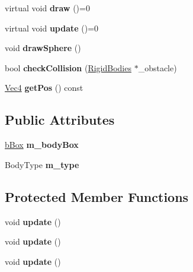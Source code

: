 \begin{DoxyCompactItemize}
\item 
\hypertarget{classRigidBodies_a766502b7ce11577ed2dcdff5c723896f}{
virtual void {\bfseries draw} ()=0}
\label{classRigidBodies_a766502b7ce11577ed2dcdff5c723896f}

\item 
\hypertarget{classRigidBodies_ab0f20db71f5433eacca400230c3beebc}{
virtual void {\bfseries update} ()=0}
\label{classRigidBodies_ab0f20db71f5433eacca400230c3beebc}

\item 
\hypertarget{classRigidBodies_a5c1853603537bf8397b1c186194da3be}{
void {\bfseries drawSphere} ()}
\label{classRigidBodies_a5c1853603537bf8397b1c186194da3be}

\item 
\hypertarget{classRigidBodies_a2b6460d70800f65e4ea2aef1a04b6c53}{
bool {\bfseries checkCollision} (\hyperlink{classRigidBodies}{RigidBodies} $\ast$\_\-obstacle)}
\label{classRigidBodies_a2b6460d70800f65e4ea2aef1a04b6c53}

\item 
\hypertarget{classRigidBodies_a7cebe73aed519b306f10b145acaf9696}{
\hyperlink{classVec4}{Vec4} {\bfseries getPos} () const }
\label{classRigidBodies_a7cebe73aed519b306f10b145acaf9696}

\end{DoxyCompactItemize}
\subsection*{Public Attributes}
\begin{DoxyCompactItemize}
\item 
\hypertarget{classRigidBodies_a08d9ec20a6c81928f618a87db2cc1f33}{
\hyperlink{structRigidBodies_1_1BBOX}{bBox} {\bfseries m\_\-bodyBox}}
\label{classRigidBodies_a08d9ec20a6c81928f618a87db2cc1f33}

\item 
\hypertarget{classRigidBodies_a08b541eb4e1940babfdf510a926cbd78}{
BodyType {\bfseries m\_\-type}}
\label{classRigidBodies_a08b541eb4e1940babfdf510a926cbd78}

\end{DoxyCompactItemize}
\subsection*{Protected Member Functions}
\begin{DoxyCompactItemize}
\item 
\hypertarget{classRigidBodies_aa353d1bdffcee20a7fdb635d848647f3}{
void {\bfseries update} ()}
\label{classRigidBodies_aa353d1bdffcee20a7fdb635d848647f3}

\item 
\hypertarget{classRigidBodies_aa353d1bdffcee20a7fdb635d848647f3}{
void {\bfseries update} ()}
\label{classRigidBodies_aa353d1bdffcee20a7fdb635d848647f3}

\item 
\hypertarget{classRigidBodies_aa353d1bdffcee20a7fdb635d848647f3}{
void {\bfseries update} ()}
\label{classRigidBodies_aa353d1bdffcee20a7fdb635d848647f3}

\end{DoxyCompactItemize}
